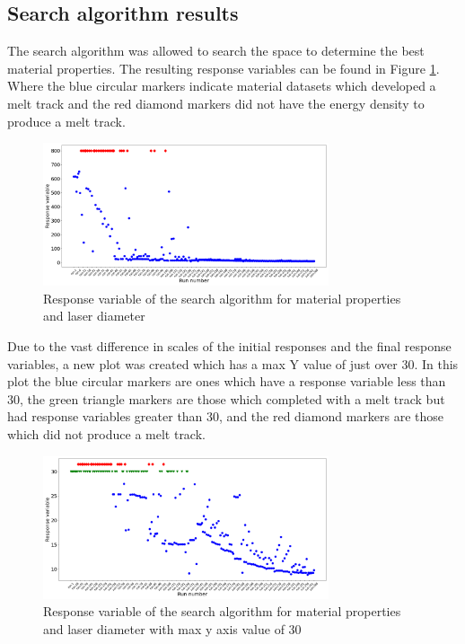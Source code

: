 \documentclass[pdflatex,sn-mathphys]{sn-jnl}
\begin{document}
	\subsection{Search algorithm results}
	\label{results}

	The search algorithm was allowed to search the space to determine the best material properties.  The resulting response variables can be found in Figure \ref{fig:response_complete}.  Where the blue circular markers indicate material datasets which developed a melt track and the red diamond markers did not have the energy density to produce a melt track.
	\begin{figure}[!htb]
		\centering
		\includegraphics[width=0.75\textwidth]{response_complete}
		\caption{Response variable of the search algorithm for material properties and laser diameter}
		\label{fig:response_complete}
	\end{figure}
	Due to the vast difference in scales of the initial responses and the final response variables, a new plot was created which has a max Y value of just over 30.  In this plot the blue circular markers are ones which have a response variable less than 30, the green triangle markers are those which completed with a melt track but had response variables greater than 30, and the red diamond markers are those which did not produce a melt track.
	\begin{figure}[!htb]
		\centering
		\includegraphics[width=0.75\textwidth]{response_zoomed}
		\caption{Response variable of the search algorithm for material properties and laser diameter with max y axis value of 30}
		\label{fig:response_zoomed}
	\end{figure}
\end{document}

